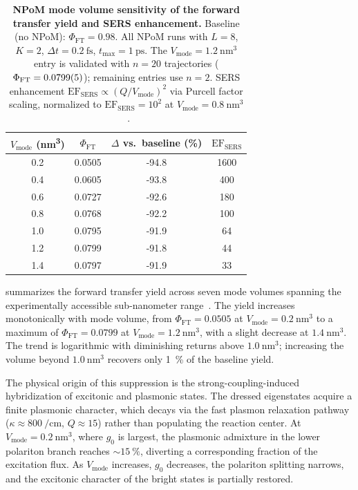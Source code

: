 \documentclass[onecolumn,a4paper,12pt]{article}
\begin{document}
\begin{table}[htbp]
\centering
\caption{\textbf{NPoM mode volume sensitivity of the forward transfer yield and SERS enhancement.}
Baseline (no NPoM): $\Phi_{\mathrm{FT}} = 0.98$. All NPoM runs with $L=8$, $K=2$, $\Delta t = \qty{0.2}{\fs}$, $t_{\mathrm{max}} = \qty{1}{\ps}$. The $V_{\mathrm{mode}} = \qty{1.2}{\nm\cubed}$ entry is validated with $n=20$ trajectories ($\Phi_{\mathrm{FT}} = \num{0.0799 \pm 0.0005}$); remaining entries use $n=2$. SERS enhancement $\mathrm{EF}_{\mathrm{SERS}} \propto (Q/V_{\mathrm{mode}})^2$ via Purcell factor scaling, normalized to $\mathrm{EF}_{\mathrm{SERS}} = 10^2$ at $V_{\mathrm{mode}} = \qty{0.8}{\nm\cubed}$~\cite{Chikkaraddy2016}.}
\label{tab:npom_volume_scan}
\begin{tabular}{S[table-format=1.1] S[table-format=1.4] S[table-format=-2.1] S[table-format=4.0]}
\toprule
{$V_{\mathrm{mode}}$ (\unit{\nm\cubed})} & {$\Phi_{\mathrm{FT}}$} & {$\Delta$ vs.\ baseline (\unit{\percent})} & {$\mathrm{EF}_{\mathrm{SERS}}$} \\
  & 0.0505 & -94.8 & 1600 \\
0.4  & 0.0605 & -93.8 & 400 \\
0.6  & 0.0727 & -92.6 & 180 \\
0.8  & 0.0768 & -92.2 & 100 \\
1.0  & 0.0795 & -91.9 & 64 \\
1.2  & 0.0799 & -91.8 & 44 \\
1.4  & 0.0797 & -91.9 & 33 \\
\bottomrule
\end{tabular}
\end{table}

 summarizes the forward transfer yield across seven mode volumes spanning the experimentally accessible sub-nanometer range~\cite{Chikkaraddy2016}.
The yield increases monotonically with mode volume, from $\Phi_{\mathrm{FT}} = 0.0505$ at $V_{\mathrm{mode}} = \qty{0.2}{\nm\cubed}$ to a maximum of $\Phi_{\mathrm{FT}} = 0.0799$ at $V_{\mathrm{mode}} = \qty{1.2}{\nm\cubed}$, with a slight decrease at $\qty{1.4}{\nm\cubed}$.
The trend is logarithmic with diminishing returns above $\qty{1.0}{\nm\cubed}$; increasing the volume beyond $\qty{1.0}{\nm\cubed}$ recovers only \qty{1}{\percent} of the baseline yield.

The physical origin of this suppression is the strong-coupling-induced hybridization of excitonic and plasmonic states.
The dressed eigenstates acquire a finite plasmonic character, which decays via the fast plasmon relaxation pathway ($\kappa \approx \qty{800}{\per\cm}$, $Q \approx 15$) rather than populating the reaction center.
At $V_{\mathrm{mode}} = \qty{0.2}{\nm\cubed}$, where $g_0$ is largest, the plasmonic admixture in the lower polariton branch reaches $\sim \qty{15}{\percent}$, diverting a corresponding fraction of the excitation flux.
As $V_{\mathrm{mode}}$ increases, $g_0$ decreases, the polariton splitting narrows, and the excitonic character of the bright states is partially restored.
\end{document}
